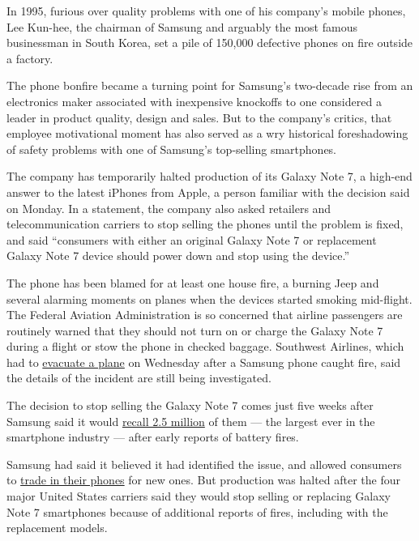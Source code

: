 In 1995, furious over quality problems with one of his company's mobile
phones, Lee Kun-hee, the chairman of Samsung and arguably the most
famous businessman in South Korea, set a pile of 150,000 defective
phones on fire outside a factory.

The phone bonfire became a turning point for Samsung's two-decade rise
from an electronics maker associated with inexpensive knockoffs to one
considered a leader in product quality, design and sales. But to the
company's critics, that employee motivational moment has also served as
a wry historical foreshadowing of safety problems with one of Samsung's
top-selling smartphones.

The company has temporarily halted production of its Galaxy Note 7, a
high-end answer to the latest iPhones from Apple, a person familiar with
the decision said on Monday. In a statement, the company also asked
retailers and telecommunication carriers to stop selling the phones
until the problem is fixed, and said ``consumers with either an original
Galaxy Note 7 or replacement Galaxy Note 7 device should power down and
stop using the device.''

The phone has been blamed for at least one house fire, a burning Jeep
and several alarming moments on planes when the devices started smoking
mid-flight. The Federal Aviation Administration is so concerned that
airline passengers are routinely warned that they should not turn on or
charge the Galaxy Note 7 during a flight or stow the phone in checked
baggage. Southwest Airlines, which had to
\href{http://www.nytimes3xbfgragh.onion/2016/10/06/business/southwest-samsung.html}{evacuate
a plane} on Wednesday after a Samsung phone caught fire, said the
details of the incident are still being investigated.

The decision to stop selling the Galaxy Note 7 comes just five weeks
after Samsung said it would
\href{http://www.nytimes3xbfgragh.onion/2016/09/03/business/samsung-galaxy-note-battery.html}{recall
2.5 million} of them --- the largest ever in the smartphone industry ---
after early reports of battery fires.

Samsung had said it believed it had identified the issue, and allowed
consumers to
\href{http://www.nytimes3xbfgragh.onion/2016/09/20/technology/personaltech/what-to-do-if-you-have-a-samsung-galaxy-note-7.html}{trade
in their phones} for new ones. But production was halted after the four
major United States carriers said they would stop selling or replacing
Galaxy Note 7 smartphones because of additional reports of fires,
including with the replacement models.

